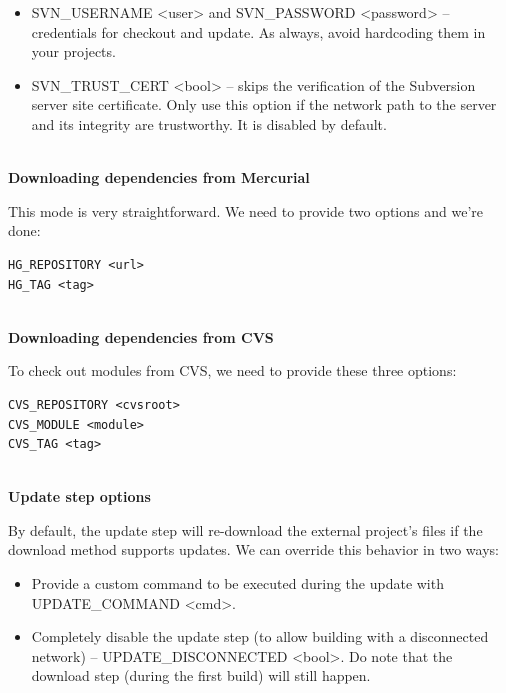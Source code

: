 \begin{itemize}
\item 
SVN\_USERNAME <user> and SVN\_PASSWORD <password> – credentials for checkout and update. As always, avoid hardcoding them in your projects.
	
\item 
SVN\_TRUST\_CERT <bool> – skips the verification of the Subversion server site certificate. Only use this option if the network path to the server and its integrity are trustworthy. It is disabled by default.
\end{itemize}

\hspace*{\fill} \\ %
\noindent
\textbf{Downloading dependencies from Mercurial}

This mode is very straightforward. We need to provide two options and we're done:

\begin{lstlisting}[style=styleCMake]
HG_REPOSITORY <url>
HG_TAG <tag>
\end{lstlisting} 

\hspace*{\fill} \\ %
\noindent
\textbf{Downloading dependencies from CVS}

To check out modules from CVS, we need to provide these three options:

\begin{lstlisting}[style=styleCMake]
CVS_REPOSITORY <cvsroot>
CVS_MODULE <module>
CVS_TAG <tag>
\end{lstlisting} 

\hspace*{\fill} \\ %
\noindent
\textbf{Update step options}

By default, the update step will re-download the external project's files if the download method supports updates. We can override this behavior in two ways:

\begin{itemize}
\item 
Provide a custom command to be executed during the update with UPDATE\_COMMAND <cmd>.

\item 
Completely disable the update step (to allow building with a disconnected network) – UPDATE\_DISCONNECTED <bool>. Do note that the download step (during the first build) will still happen.
\end{itemize}

